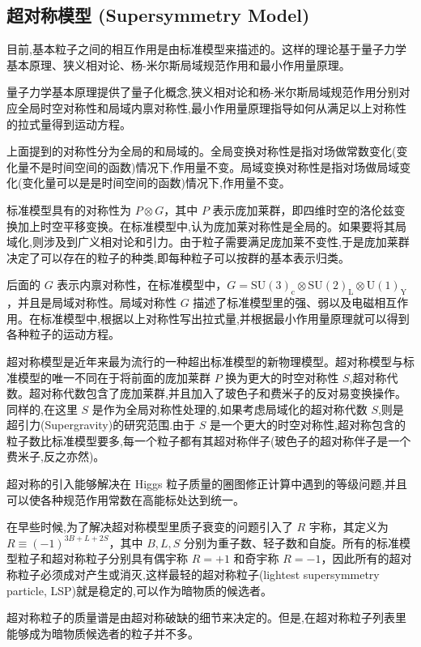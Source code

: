 \documentclass{beamer} %
\begin{document}
\subsection{超对称模型 (Supersymmetry Model)}

\begin{frame}
目前,基本粒子之间的相互作用是由标准模型来描述的。这样的理论基于量子力学基本原理、狭义相对论、杨-米尔斯局域规范作用和最小作用量原理。

量子力学基本原理提供了量子化概念,狭义相对论和杨-米尔斯局域规范作用分别对应全局时空对称性和局域内禀对称性,最小作用量原理指导如何从满足以上对称性的拉式量得到运动方程。

上面提到的对称性分为全局的和局域的。全局变换对称性是指对场做常数变化(变化量不是时间空间的函数)情况下,作用量不变。局域变换对称性是指对场做局域变化(变化量可以是是时间空间的函数)情况下,作用量不变。
\end{frame}

\begin{frame}
标准模型具有的对称性为 $P\otimes G$，其中 $P$ 表示庞加莱群，即四维时空的洛伦兹变换加上时空平移变换。在标准模型中,认为庞加莱对称性是全局的。如果要将其局域化,则涉及到广义相对论和引力。由于粒子需要满足庞加莱不变性,于是庞加莱群决定了可以存在的粒子的种类,即每种粒子可以按群的基本表示归类。

后面的 $G$ 表示内禀对称性，在标准模型中，$G=\mathrm{SU(3)_c \otimes SU(2)_L \otimes U(1)_Y }$，并且是局域对称性。局域对称性 $G$ 描述了标准模型里的强、弱以及电磁相互作用。在标准模型中,根据以上对称性写出拉式量,并根据最小作用量原理就可以得到各种粒子的运动方程。
\end{frame}

\begin{frame}
超对称模型是近年来最为流行的一种超出标准模型的新物理模型。超对称模型与标准模型的唯一不同在于将前面的庞加莱群 $P$ 换为更大的时空对称性 $S$,超对称代数。超对称代数包含了庞加莱群,并且加入了玻色子和费米子的反对易变换操作。同样的,在这里 $S$ 是作为全局对称性处理的,如果考虑局域化的超对称代数 $S$,则是超引力(Supergravity)的研究范围.由于 $S$ 是一个更大的时空对称性,超对称包含的粒子数比标准模型要多,每一个粒子都有其超对称伴子(玻色子的超对称伴子是一个费米子,反之亦然)。
\end{frame}

\begin{frame}
超对称的引入能够解决在 Higgs 粒子质量的圈图修正计算中遇到的等级问题,并且可以使各种规范作用常数在高能标处达到统一。

在早些时候,为了解决超对称模型里质子衰变的问题引入了 $R$ 宇称，其定义为 $R\equiv (-1)^{3B+L+2S}$，其中 $B,L,S$ 分别为重子数、轻子数和自旋。所有的标准模型粒子和超对称粒子分别具有偶宇称 $R=+1$ 和奇宇称 $R=-1$，因此所有的超对称粒子必须成对产生或消灭,这样最轻的超对称粒子(lightest supersymmetry particle, LSP)就是稳定的,可以作为暗物质的候选者。

超对称粒子的质量谱是由超对称破缺的细节来决定的。但是,在超对称粒子列表里能够成为暗物质候选者的粒子并不多。
\end{frame}
\end{document}
